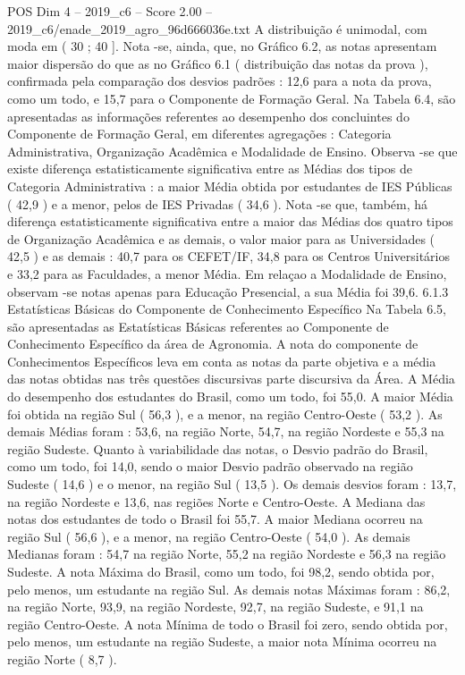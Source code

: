 \begin{textsample}{POS Dim 4 – 2019\_c6 – Score 2.00 – 2019\_c6/enade\_2019\_agro\_96d666036e.txt}
A distribuição é unimodal, com moda em ( 30 ; 40 ].
Nota -se, ainda, que, no Gráfico 6.2, as notas apresentam maior dispersão do que as no Gráfico 6.1 ( distribuição das notas da prova ), confirmada pela comparação dos desvios padrões : 12,6 para a nota da prova, como um todo, e 15,7 para o Componente de Formação Geral.
Na Tabela 6.4, são apresentadas as informações referentes ao desempenho dos concluintes do Componente de Formação Geral, em diferentes agregações : Categoria Administrativa, Organização Acadêmica e Modalidade de Ensino.
Observa -se que existe diferença estatisticamente significativa entre as Médias dos tipos de Categoria Administrativa : a maior Média obtida por estudantes de IES Públicas ( 42,9 ) e a menor, pelos de IES Privadas ( 34,6 ).
Nota -se que, também, há diferença estatisticamente significativa entre a maior das Médias dos quatro tipos de Organização Acadêmica e as demais, o valor maior para as Universidades ( 42,5 ) e as demais : 40,7 para os CEFET/IF, 34,8 para os Centros Universitários e 33,2 para as Faculdades, a menor Média.
Em relaçao a Modalidade de Ensino, observam -se notas apenas para Educação Presencial, a sua Média foi 39,6. 6.1.3 Estatísticas Básicas do Componente de Conhecimento Específico Na Tabela 6.5, são apresentadas as Estatísticas Básicas referentes ao Componente de Conhecimento Específico da área de Agronomia.
A nota do componente de Conhecimentos Específicos leva em conta as notas da parte objetiva e a média das notas obtidas nas três questões discursivas parte discursiva da Área.
A Média do desempenho dos estudantes do Brasil, como um todo, foi 55,0.
A maior Média foi obtida na região Sul ( 56,3 ), e a menor, na região Centro-Oeste ( 53,2 ).
As demais Médias foram : 53,6, na região Norte, 54,7, na região Nordeste e 55,3 na região Sudeste.
Quanto à variabilidade das notas, o Desvio padrão do Brasil, como um todo, foi 14,0, sendo o maior Desvio padrão observado na região Sudeste ( 14,6 ) e o menor, na região Sul ( 13,5 ).
Os demais desvios foram : 13,7, na região Nordeste e 13,6, nas regiões Norte e Centro-Oeste.
A Mediana das notas dos estudantes de todo o Brasil foi 55,7.
A maior Mediana ocorreu na região Sul ( 56,6 ), e a menor, na região Centro-Oeste ( 54,0 ).
As demais Medianas foram : 54,7 na região Norte, 55,2 na região Nordeste e 56,3 na região Sudeste.
A nota Máxima do Brasil, como um todo, foi 98,2, sendo obtida por, pelo menos, um estudante na região Sul.
As demais notas Máximas foram : 86,2, na região Norte, 93,9, na região Nordeste, 92,7, na região Sudeste, e 91,1 na região Centro-Oeste.
A nota Mínima de todo o Brasil foi zero, sendo obtida por, pelo menos, um estudante na região Sudeste, a maior nota Mínima ocorreu na região Norte ( 8,7 ).

\end{textsample}
